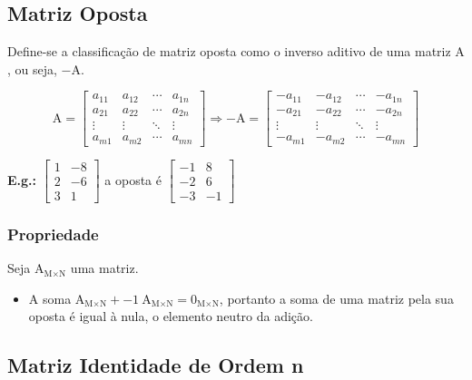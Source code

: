\documentclass[a4paper,12pt]{article}
\begin{document}
\subsection{Matriz Oposta}

Define-se a classificação de matriz oposta como o inverso aditivo de uma matriz $ \text{A} $, ou seja, $ -\text{A} $.

$$ \text{A} = \begin{bmatrix}
 a_{11} & a_{12} & \cdots & a_{1n} \\
 a_{21} & a_{22} & \cdots & a_{2n} \\
 \vdots & \vdots & \ddots & \vdots \\
 a_{m1} & a_{m2} & \cdots & a_{mn}
 \end{bmatrix} \Rightarrow - \text{A} = \begin{bmatrix}
 -a_{11} & -a_{12} & \cdots & -a_{1n} \\
 -a_{21} & -a_{22} & \cdots & -a_{2n} \\
 \vdots & \vdots & \ddots & \vdots \\
 -a_{m1} & -a_{m2} & \cdots & -a_{mn}
 \end{bmatrix} $$

\textbf{E.g.:} $ \begin{bmatrix}
1 & -8 \\
2 & -6 \\
3 & 1
\end{bmatrix} $ a oposta é $ \begin{bmatrix}
-1 & 8 \\
-2 & 6 \\
-3 & -1
\end{bmatrix} $

\subsubsection{Propriedade}
Seja $ \text{A}_{\text{M} \times \text{N}} $ uma matriz.
\begin{itemize}
    \item A soma $ \text{A}_{\text{M} \times \text{N}} + -1 \ \text{A}_{\text{M} \times \text{N}} = \text{0}_{\text{M} \times \text{N}} $, portanto a soma de uma matriz pela sua oposta é igual à nula, o elemento neutro da adição.
\end{itemize}

\subsection{Matriz Identidade de Ordem \textbf{n}}
\end{document}
